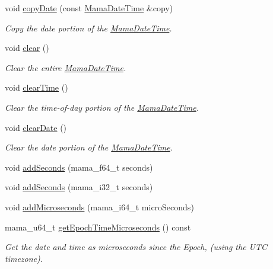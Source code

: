 \begin{DoxyCompactItemize}
void \hyperlink{classWombat_1_1MamaDateTime_a9db656b8007a727d23d617c00dce61b5}{copyDate} (const \hyperlink{classWombat_1_1MamaDateTime}{MamaDateTime} \&copy)
\begin{DoxyCompactList}\small\item\em Copy the date portion of the \hyperlink{classWombat_1_1MamaDateTime}{MamaDateTime}. \item\end{DoxyCompactList}\item 
void \hyperlink{classWombat_1_1MamaDateTime_ae54ba1acde2bfa793078c972fa6a12fd}{clear} ()
\begin{DoxyCompactList}\small\item\em Clear the entire \hyperlink{classWombat_1_1MamaDateTime}{MamaDateTime}. \item\end{DoxyCompactList}\item 
void \hyperlink{classWombat_1_1MamaDateTime_a9399de71fe3c26fa8c1c94b8279195bb}{clearTime} ()
\begin{DoxyCompactList}\small\item\em Clear the time-\/of-\/day portion of the \hyperlink{classWombat_1_1MamaDateTime}{MamaDateTime}. \item\end{DoxyCompactList}\item 
void \hyperlink{classWombat_1_1MamaDateTime_a8e6693500b38915d68afb54b4ad3dc9b}{clearDate} ()
\begin{DoxyCompactList}\small\item\em Clear the date portion of the \hyperlink{classWombat_1_1MamaDateTime}{MamaDateTime}. \item\end{DoxyCompactList}\item 
void \hyperlink{classWombat_1_1MamaDateTime_a914be94d3770fa57b01e543b07f4896b}{addSeconds} (mama\_\-f64\_\-t seconds)
\item 
void \hyperlink{classWombat_1_1MamaDateTime_a903f9fab62263e0e349e5ceb93229385}{addSeconds} (mama\_\-i32\_\-t seconds)
\item 
void \hyperlink{classWombat_1_1MamaDateTime_a3dee4c25584a8a79a5493e8f62fc2cf6}{addMicroseconds} (mama\_\-i64\_\-t microSeconds)
\item 
mama\_\-u64\_\-t \hyperlink{classWombat_1_1MamaDateTime_ab9814ea39a88a354c0c99b31f920a14c}{getEpochTimeMicroseconds} () const 
\begin{DoxyCompactList}\small\item\em Get the date and time as microseconds since the Epoch, (using the UTC timezone). \item\end{DoxyCompactList}\item 

\end{DoxyCompactItemize}
